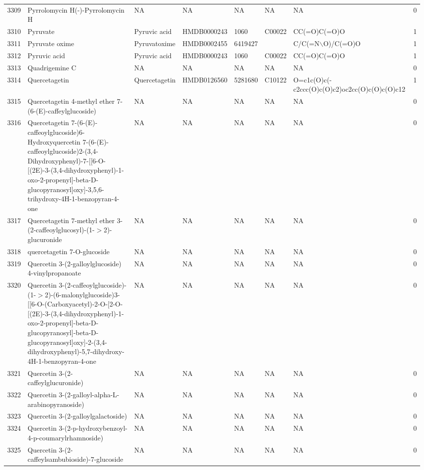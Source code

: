 \documentclass[a4paper]{article}
\begin{document}
\begin{longtable}{rlllllll}
  3309 & Pyrrolomycin H(-)-Pyrrolomycin H & NA & NA & NA & NA & NA & 0 \\ 
  3310 & Pyruvate & Pyruvic acid & HMDB0000243 & 1060 & C00022 & CC(=O)C(=O)O & 1 \\ 
  3311 & Pyruvate oxime & Pyruvatoxime & HMDB0002455 & 6419427 &  & C/C(=N$\backslash$O)/C(=O)O & 1 \\ 
  3312 & Pyruvic acid & Pyruvic acid & HMDB0000243 & 1060 & C00022 & CC(=O)C(=O)O & 1 \\ 
  3313 & Quadrigemine C & NA & NA & NA & NA & NA & 0 \\ 
  3314 & Quercetagetin & Quercetagetin & HMDB0126560 & 5281680 & C10122 & O=c1c(O)c(-c2ccc(O)c(O)c2)oc2cc(O)c(O)c(O)c12 & 1 \\ 
  3315 & Quercetagetin 4-methyl ether 7-(6-(E)-caffeylglucoside) & NA & NA & NA & NA & NA & 0 \\ 
  3316 & Quercetagetin 7-(6-(E)-caffeoylglucoside)6-Hydroxyquercetin 7-(6-(E)-caffeoylglucoside)2-(3,4-Dihydroxyphenyl)-7-[[6-O-[(2E)-3-(3,4-dihydroxyphenyl)-1-oxo-2-propenyl]-beta-D-glucopyranosyl]oxy]-3,5,6-trihydroxy-4H-1-benzopyran-4-one & NA & NA & NA & NA & NA & 0 \\ 
  3317 & Quercetagetin 7-methyl ether 3-(2-caffeoylglucosyl)-(1-$>$2)-glucuronide & NA & NA & NA & NA & NA & 0 \\ 
  3318 & quercetagetin 7-O-glucoside & NA & NA & NA & NA & NA & 0 \\ 
  3319 & Quercetin 3-(2-galloylglucoside) 4-vinylpropanoate & NA & NA & NA & NA & NA & 0 \\ 
  3320 & Quercetin 3-(2-caffeoylglucoside)-(1-$>$2)-(6-malonylglucoside)3-[[6-O-(Carboxyacetyl)-2-O-[2-O-[(2E)-3-(3,4-dihydroxyphenyl)-1-oxo-2-propenyl]-beta-D-glucopyranosyl]-beta-D-glucopyranosyl]oxy]-2-(3,4-dihydroxyphenyl)-5,7-dihydroxy-4H-1-benzopyran-4-one & NA & NA & NA & NA & NA & 0 \\ 
  3321 & Quercetin 3-(2-caffeylglucuronide) & NA & NA & NA & NA & NA & 0 \\ 
  3322 & Quercetin 3-(2-galloyl-alpha-L-arabinopyranoside) & NA & NA & NA & NA & NA & 0 \\ 
  3323 & Quercetin 3-(2-galloylgalactoside) & NA & NA & NA & NA & NA & 0 \\ 
  3324 & Quercetin 3-(2-p-hydroxybenzoyl-4-p-coumarylrhamnoside) & NA & NA & NA & NA & NA & 0 \\ 
  3325 & Quercetin 3-(2-caffeylsambubioside)-7-glucoside & NA & NA & NA & NA & NA & 0 \\ 

\end{longtable}
\end{document}
